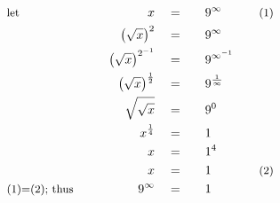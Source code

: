 \begin{alignat*}{7}
&\small\text{let}&x\quad&=\quad&&9^\infty\qquad&&\small\text{(1)}\\
&\,&\left(\sqrt{x}\right)^2\quad&=&&9^\infty\\
&\,&\left(\sqrt{x}\right)^{2^{-1}}\quad&=&&9^{\infty^{-1}}\\
&\,&\left(\sqrt{x}\right)^{\frac{1}{2}}\quad&=&&9^{\frac{1}{\infty}}\\
&\,&\sqrt{\sqrt{x}}\quad&=&&9^0\\
&\,&x^{\frac{1}{4}}\quad&=&&1\\
&\,&x\quad&=&&1^4\\
&\,&x\quad&=&&1&&\small\text{(2)}\\
&\small\text{(1)=(2); thus}\qquad&9^\infty\quad&=&&1
\end{alignat*}
